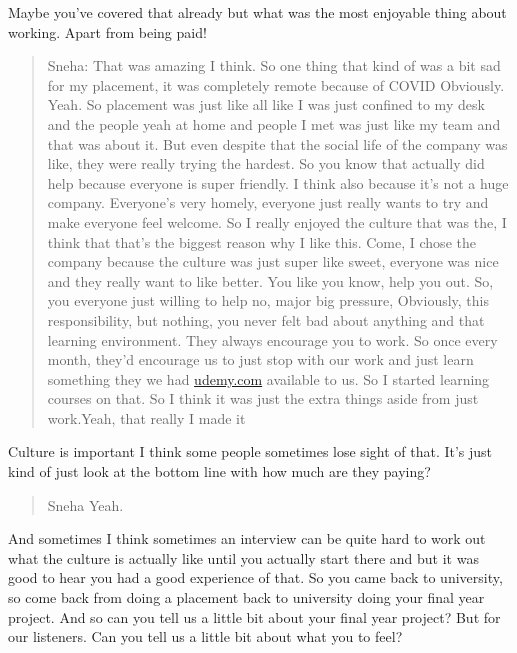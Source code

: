 \documentclass[
]{book}
\begin{document}
Maybe you've covered that already but what was the most enjoyable thing about working. Apart from being paid!

\begin{quote}
Sneha: That was amazing I think. So one thing that kind of was a bit sad for my placement, it was completely remote because of COVID Obviously. Yeah. So placement was just like all like I was just confined to my desk and the people yeah at home and people I met was just like my team and that was about it. But even despite that the social life of the company was like, they were really trying the hardest. So you know that actually did help because everyone is super friendly. I think also because it's not a huge company. Everyone's very homely, everyone just really wants to try and make everyone feel welcome. So I really enjoyed the culture that was the, I think that that's the biggest reason why I like this. Come, I chose the company because the culture was just super like sweet, everyone was nice and they really want to like better. You like you know, help you out. So, you everyone just willing to help no, major big pressure, Obviously, this responsibility, but nothing, you never felt bad about anything and that learning environment. They always encourage you to work. So once every month, they'd encourage us to just stop with our work and just learn something they we had \href{https://www.udemy.com/}{udemy.com} available to us. So I started learning courses on that. So I think it was just the extra things aside from just work.Yeah, that really I made it
\end{quote}

Culture is important I think some people sometimes lose sight of that. It's just kind of just look at the bottom line with how much are they paying?

\begin{quote}
Sneha Yeah.
\end{quote}

And sometimes I think sometimes an interview can be quite hard to work out what the culture is actually like until you actually start there and but it was good to hear you had a good experience of that. So you came back to university, so come back from doing a placement back to university doing your final year project. And so can you tell us a little bit about your final year project? But for our listeners. Can you tell us a little bit about what you to feel?
\end{document}
